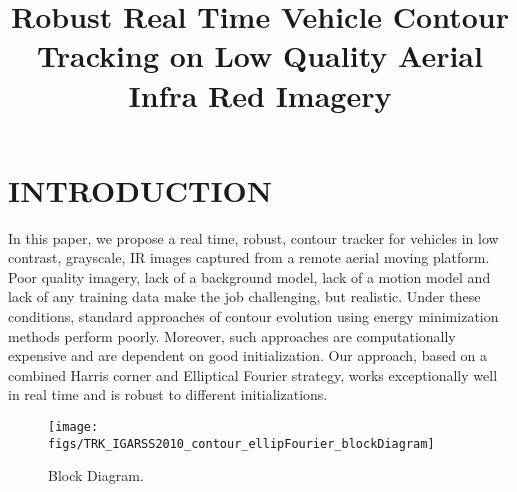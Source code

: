 \documentclass{article}
\title{Robust Real Time Vehicle Contour Tracking on Low Quality Aerial Infra Red Imagery}
\begin{document}
\onecolumn
%
\maketitle


\section{INTRODUCTION}
			
In this paper, we propose a real time, robust, contour tracker for vehicles in low contrast, grayscale, IR images captured from a remote aerial moving platform.  Poor quality imagery, lack of a background model, lack of a motion model and lack of any training data make the job challenging, but realistic.  Under these conditions, standard approaches of contour evolution using energy minimization methods perform poorly.  Moreover, such approaches are computationally expensive and are dependent on good initialization.  Our approach, based on a combined Harris corner and Elliptical Fourier strategy, works exceptionally well in real time and is robust to different initializations.

			\begin{figure}
						\centering
						\texttt{[image: figs/TRK\_IGARSS2010\_contour\_ellipFourier\_blockDiagram]}
						\caption{Block Diagram.}
						\label{fig:BlockDiagram}
			\end{figure}
			
%			
			
\end{document}
